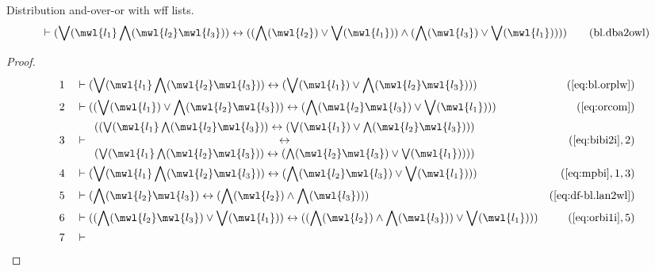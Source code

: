 \begin{lemma} {Distribution and-over-or with wff lists.}
\begin{align}
\vdash ( \bigvee( \mwl{l_1} \bigwedge( \mwl{l_2} \mwl{l_3} ) ) \leftrightarrow
    ( ( \bigwedge( \mwl{l_2} ) \vee \bigvee( \mwl{l_1} ) ) \wedge ( \bigwedge(
    \mwl{l_3} ) \vee \bigvee( \mwl{l_1} ) ) )
    )\label{eq:bl.dba2owl}\tag{bl.dba2owl}
\end{align}
\end{lemma}


\begin{proof}
\begin{align}
  1 &&  & \vdash ( \bigvee( \mwl{l_1} \bigwedge( \mwl{l_2} \mwl{l_3} ) )
     \leftrightarrow ( \bigvee( \mwl{l_1} ) \vee
     \bigwedge( \mwl{l_2} \mwl{l_3} ) )
     )&(\mbox{\ref{eq:bl.orplw}})\notag
  \\ 2 &&  & \vdash ( ( \bigvee( \mwl{l_1} ) \vee \bigwedge( \mwl{l_2}
     \mwl{l_3} ) ) \leftrightarrow ( \bigwedge( \mwl{l_2}
     \mwl{l_3} ) \vee \bigvee( \mwl{l_1} ) )
     )&(\mbox{\ref{eq:orcom}})\notag
  \\ 3 &&  & \vdash
    \begin{array}{c}    
     ( ( \bigvee( \mwl{l_1} \bigwedge( \mwl{l_2} \mwl{l_3} ) )
     \leftrightarrow ( \bigvee( \mwl{l_1} ) \vee
     \bigwedge( \mwl{l_2} \mwl{l_3} ) ) ) \\ \leftrightarrow \\
     ( \bigvee( \mwl{l_1} \bigwedge( \mwl{l_2} \mwl{l_3} )
     ) \leftrightarrow ( \bigwedge( \mwl{l_2} \mwl{l_3} )
     \vee \bigvee( \mwl{l_1} ) ) )
     )
     \end{array}
     & (\mbox{\ref{eq:bibi2i}},2)\notag
  \\ 4 &&  & \vdash ( \bigvee( \mwl{l_1} \bigwedge( \mwl{l_2} \mwl{l_3} ) )
     \leftrightarrow ( \bigwedge( \mwl{l_2} \mwl{l_3} )
     \vee \bigvee( \mwl{l_1} ) )
     )&(\mbox{\ref{eq:mpbi}},1,3)\notag
  \\ 5 &&  & \vdash ( \bigwedge( \mwl{l_2} \mwl{l_3} ) \leftrightarrow (
     \bigwedge( \mwl{l_2} ) \wedge \bigwedge( \mwl{l_3} )
     ) )&(\mbox{\ref{eq:df-bl.lan2wl}})\notag
  \\ 6 &&  & \vdash ( ( \bigwedge( \mwl{l_2} \mwl{l_3} ) \vee \bigvee(
     \mwl{l_1} ) ) \leftrightarrow ( ( \bigwedge(
     \mwl{l_2} ) \wedge \bigwedge( \mwl{l_3} ) ) \vee
     \bigvee( \mwl{l_1} ) )
     )&(\mbox{\ref{eq:orbi1i}},5)\notag
  \\ 7 &&  & \vdash 
    \begin{array}{c}    

\end{array}
\end{align}
\end{proof}
